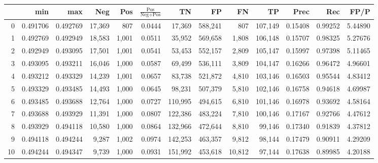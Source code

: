 \begin{tabular}{rrrrrrrrrrrrr}
\toprule
{} &       min &       max &     Neg &    Pos & $\frac{\text{Pos}}{\text{Neg}+\text{Pos}}$ &       TN &       FP &       FN &       TP &     Prec &      Rec &     FP/P \\
\midrule
0   &  0.491706 &  0.492769 &  17,369 &    807 &                                     0.0444 &   17,369 &  588,241 &      807 &  107,149 &  0.15408 &  0.99252 &  5.44890 \\
1   &  0.492769 &  0.492949 &  18,583 &  1,001 &                                     0.0511 &   35,952 &  569,658 &    1,808 &  106,148 &  0.15707 &  0.98325 &  5.27676 \\
2   &  0.492949 &  0.493095 &  17,501 &  1,001 &                                     0.0541 &   53,453 &  552,157 &    2,809 &  105,147 &  0.15997 &  0.97398 &  5.11465 \\
3   &  0.493095 &  0.493211 &  16,046 &  1,000 &                                     0.0587 &   69,499 &  536,111 &    3,809 &  104,147 &  0.16266 &  0.96472 &  4.96601 \\
4   &  0.493212 &  0.493329 &  14,239 &  1,001 &                                     0.0657 &   83,738 &  521,872 &    4,810 &  103,146 &  0.16503 &  0.95544 &  4.83412 \\
5   &  0.493329 &  0.493485 &  14,493 &  1,000 &                                     0.0645 &   98,231 &  507,379 &    5,810 &  102,146 &  0.16758 &  0.94618 &  4.69987 \\
6   &  0.493485 &  0.493688 &  12,764 &  1,000 &                                     0.0727 &  110,995 &  494,615 &    6,810 &  101,146 &  0.16978 &  0.93692 &  4.58164 \\
7   &  0.493688 &  0.493929 &  11,391 &  1,000 &                                     0.0807 &  122,386 &  483,224 &    7,810 &  100,146 &  0.17167 &  0.92766 &  4.47612 \\
8   &  0.493929 &  0.494118 &  10,580 &  1,000 &                                     0.0864 &  132,966 &  472,644 &    8,810 &   99,146 &  0.17340 &  0.91839 &  4.37812 \\
9   &  0.494118 &  0.494244 &   9,287 &  1,002 &                                     0.0974 &  142,253 &  463,357 &    9,812 &   98,144 &  0.17479 &  0.90911 &  4.29209 \\
10  &  0.494244 &  0.494347 &   9,739 &  1,000 &                                     0.0931 &  151,992 &  453,618 &   10,812 &   97,144 &  0.17638 &  0.89985 &  4.20188 \\

\end{tabular}
